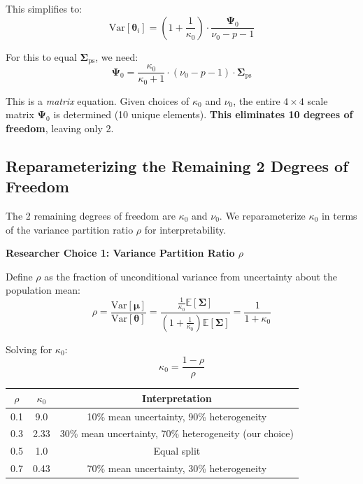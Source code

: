 \documentclass[11pt]{article}
\newcommand{\E}{\mathbb{E}}
\newcommand{\Var}{\text{Var}}
\begin{document}
This simplifies to:
\begin{equation}
  \Var[\boldsymbol{\theta}_i] = \left(1 + \frac{1}{\kappa_0}\right) \cdot \frac{\boldsymbol{\Psi}_0}{\nu_0 - p - 1}
  \label{eq:niw_unconditional_cov}
\end{equation}

For this to equal $\boldsymbol{\Sigma}_{\text{ps}}$, we need:
\begin{equation}
  \boldsymbol{\Psi}_0 = \frac{\kappa_0}{\kappa_0 + 1} \cdot (\nu_0 - p - 1) \cdot \boldsymbol{\Sigma}_{\text{ps}}
  \label{eq:psi_constraint}
\end{equation}

This is a \textit{matrix} equation. Given choices of $\kappa_0$ and $\nu_0$, the entire $4 \times 4$ scale matrix $\boldsymbol{\Psi}_0$ is determined (10 unique elements). \textbf{This eliminates 10 degrees of freedom}, leaving only 2.

\subsection{Reparameterizing the Remaining 2 Degrees of Freedom}

The 2 remaining degrees of freedom are $\kappa_0$ and $\nu_0$. We reparameterize $\kappa_0$ in terms of the variance partition ratio $\rho$ for interpretability.

\textbf{Researcher Choice 1: Variance Partition Ratio $\rho$}

Define $\rho$ as the fraction of unconditional variance from uncertainty about the population mean:
\[
  \rho = \frac{\Var[\boldsymbol{\mu}]}{\Var[\boldsymbol{\theta}]} = \frac{\frac{1}{\kappa_0} \E[\boldsymbol{\Sigma}]}{\left(1 + \frac{1}{\kappa_0}\right) \E[\boldsymbol{\Sigma}]} = \frac{1}{1 + \kappa_0}
\]

Solving for $\kappa_0$:
\begin{equation}
  \kappa_0 = \frac{1 - \rho}{\rho}
  \label{eq:kappa_from_rho}
\end{equation}

\begin{center}
\begin{tabular}{ccc}
\toprule
$\rho$ & $\kappa_0$ & Interpretation \\
\midrule
0.1 & 9.0 & 10\% mean uncertainty, 90\% heterogeneity \\
0.3 & 2.33 & 30\% mean uncertainty, 70\% heterogeneity (our choice) \\
0.5 & 1.0 & Equal split \\
0.7 & 0.43 & 70\% mean uncertainty, 30\% heterogeneity \\
\bottomrule
\end{tabular}
\end{center}
\end{document}
